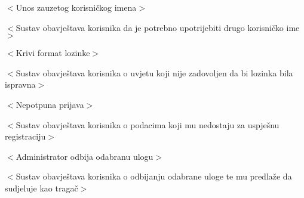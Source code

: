 					\item[] \begin{packed_item}
						
						\item[3.a] $<$Unos zauzetog korisničkog imena$>$
						\item[] \begin{packed_enum}
							
							\item $<$Sustav obavještava korisnika da je potrebno upotrijebiti drugo korisničko ime$>$
	
						\end{packed_enum}

						\item[3.b] $<$Krivi format lozinke$>$\begin{packed_enum}
							
							\item $<$Sustav obavještava korisnika o uvjetu koji nije zadovoljen da bi lozinka bila ispravna$>$
							
						\end{packed_enum}
						
						\item[3.c] $<$Nepotpuna prijava$>$\begin{packed_enum}
							
							\item $<$Sustav obavještava korisnika o podacima koji mu nedostaju za uspješnu registraciju$>$
							
						\end{packed_enum}
						
						\item[4.a] $<$Administrator odbija odabranu ulogu$>$\begin{packed_enum}
							
							\item $<$Sustav obavještava korisnika o odbijanju odabrane uloge te mu predlaže da sudjeluje kao tragač$>$
							
						\end{packed_enum}
						
					\end{packed_item}
					
